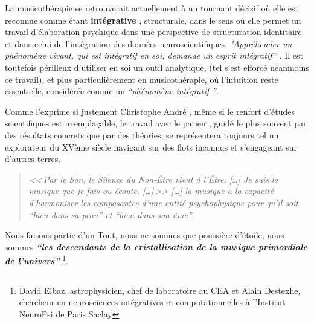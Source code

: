 La musicothérapie  se retrouverait actuellement
 à un tournant décisif où elle est reconnue comme étant
 \textbf{ intégrative} \autocite[ch. III, p. 53,
 105]{vrait_musicotherapie_2018},
struc\-tu\-rale, dans le sens où elle permet un travail d'élaboration psychique dans une perspective de structuration identitaire  et dans celui de l'intégration des données neuroscientifiques.
\textit{"Appréhender un phénomène vivant, qui est intégratif en soi, demande un esprit
  intégratif''} \autocite[201]{van_eersel_cerveau}.
Il est toutefois périlleux d'utiliser en soi un outil analytique, (tel s'est efforcé néanmoins ce travail), et
plus
particulièrement en musicothérapie, où l'intuition reste essentielle,
considérée comme un \textit{``phénomène intégratif ''}.

Comme l'exprime si justement Christophe André \autocite[154]{van_eersel_cerveau},
même si le renfort d'études
scientifiques est irremplaçable, le travail avec le patient, guidé le plus souvent  par des résultats
concrets que par des théories, se représentera toujours
tel un
explorateur du XVème siècle navigant sur des flots inconnus et
s'engageant sur d'autres terres.


\begin{quotation}
\emph{<<\,\emph{Par le Son, le Silence du Non-Être vient à l'Être}. [\dots]
\textsl{Je suis}
	\emph{la musique que je fais ou écoute}. [\dots]\,>>
[\ldots] \emph{la musique a la capacité d'harmoniser
les composantes d'une entité psychophysique pour qu'il soit ``bien
dans sa peau'' et ``bien dans son âme}''}.\, \autocite[ch. 1, p.8]{viret:b}
\end{quotation}

Nous faisons partie d'un Tout, nous ne sommes que poussière d'étoile,
nous sommes
\textit{\textbf{``les descendants de la  cristallisation de la musique primordiale de
l'univers''}} \autocite{delbaz_recherche_2016} \footnote{David Elbaz, astrophysicien, chef de laboratoire au CEA et Alain
Destexhe, chercheur en neurosciences intégratives et computationnelles
à l'Institut  NeuroPsi de Paris Saclay}.




